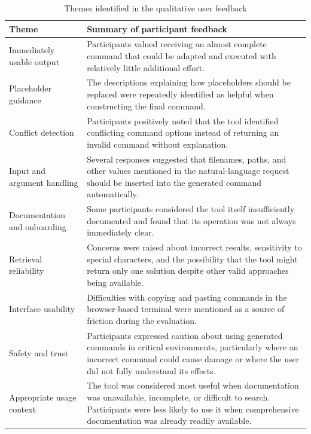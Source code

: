 \FloatBarrier
\begin{table}[htbp]
    \centering
    \caption{Themes identified in the qualitative user feedback}
    \label{tab:qualitative-feedback-themes}
    \begin{tabular}{p{3.5cm} p{9.5cm}}
        \hline
        \textbf{Theme} & \textbf{Summary of participant feedback} \\
        \hline

        Immediately usable output &
        Participants valued receiving an almost complete command that could be adapted and executed with relatively little additional effort. \\

        Placeholder guidance &
        The descriptions explaining how placeholders should be replaced were repeatedly identified as helpful when constructing the final command. \\

        Conflict detection &
        Participants positively noted that the tool identified conflicting command options instead of returning an invalid command without explanation. \\

        Input and argument handling &
        Several responses suggested that filenames, paths, and other values mentioned in the natural-language request should be inserted into the generated command automatically. \\

        Documentation and onboarding &
        Some participants considered the tool itself insufficiently documented and found that its operation was not always immediately clear. \\

        Retrieval reliability &
        Concerns were raised about incorrect results, sensitivity to special characters, and the possibility that the tool might return only one solution despite other valid approaches being available. \\

        Interface usability &
        Difficulties with copying and pasting commands in the browser-based terminal were mentioned as a source of friction during the evaluation. \\

        Safety and trust &
        Participants expressed caution about using generated commands in critical environments, particularly where an incorrect command could cause damage or where the user did not fully understand its effects. \\

        Appropriate usage context &
        The tool was considered most useful when documentation was unavailable, incomplete, or difficult to search. Participants were less likely to use it when comprehensive documentation was already readily available. \\

        \hline
    \end{tabular}
\end{table}
\FloatBarrier

